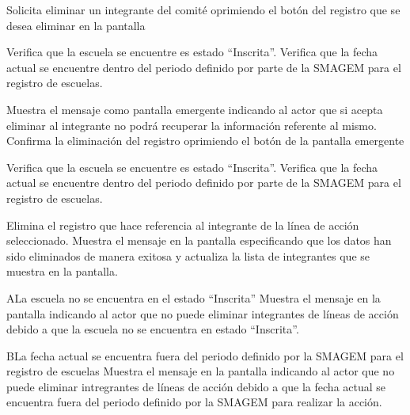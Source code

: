 % 
 \begin{UCtrayectoria}
    \UCpaso[\UCactor] Solicita eliminar un integrante del comité oprimiendo el botón \botKo del registro que se desea eliminar en la pantalla  

    \UCpaso[\UCsist] Verifica que la escuela se encuentre es estado ``Inscrita''. 
    \UCpaso[\UCsist] Verifica que la fecha actual se encuentre dentro del periodo definido por parte de la SMAGEM para el registro de escuelas.     
    
    \UCpaso[\UCsist] Muestra el mensaje  como pantalla emergente indicando al actor que si acepta eliminar al integrante no podrá recuperar la información referente al mismo.
    \UCpaso[\UCactor] Confirma la eliminación del registro oprimiendo el botón  de la pantalla emergente 
    
    \UCpaso[\UCsist] Verifica que la escuela se encuentre es estado ``Inscrita''. 
    \UCpaso[\UCsist] Verifica que la fecha actual se encuentre dentro del periodo definido por parte de la SMAGEM para el registro de escuelas.     
    
    \UCpaso[\UCsist] Elimina el registro que hace referencia al integrante de la línea de acción seleccionado.
    \UCpaso[\UCsist] Muestra el mensaje  en la pantalla  especificando que los datos han sido eliminados de manera exitosa y actualiza la lista de integrantes que se muestra en la pantalla.

 \end{UCtrayectoria}



 \begin{UCtrayectoriaA}{A}{La escuela no se encuentra en el estado ``Inscrita''}
    \UCpaso[\UCsist] Muestra el mensaje  en la pantalla  indicando al actor que no puede eliminar integrantes de líneas de acción debido a que la escuela no se encuentra en estado ``Inscrita''.
 \end{UCtrayectoriaA}

 \begin{UCtrayectoriaA}{B}{La fecha actual se encuentra fuera del periodo definido por la SMAGEM para el registro de escuelas}
    \UCpaso[\UCsist] Muestra el mensaje  en la pantalla  indicando al actor que no puede eliminar intregrantes de líneas de acción debido a que la fecha actual se encuentra fuera del periodo definido por la SMAGEM para realizar la acción.
 \end{UCtrayectoriaA}
  
